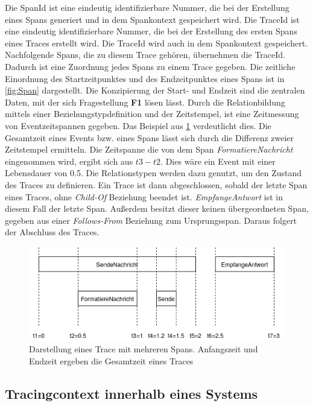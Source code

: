 Die SpanId ist eine eindeutig identifizierbare Nummer, die bei der Erstellung eines Spans generiert und in dem Spankontext gespeichert wird. Die TraceId ist eine eindeutig identifizierbare Nummer, die bei der Erstellung des ersten Spans eines Traces erstellt wird. Die TraceId wird auch in dem Spankontext gespeichert. Nachfolgende Spans, die zu diesem Trace gehören, übernehmen die TraceId. Dadurch ist eine Zuordnung jedes Spans zu einem Trace gegeben. Die zeitliche Einordnung des Startzeitpunktes und des Endzeitpunktes eines Spans ist in  \cref{fig:Span} dargestellt. Die Konzipierung der Start- und Endzeit sind die zentralen Daten, mit der sich Fragestellung \textbf{F1} lösen lässt. Durch die Relationbildung mittels einer Beziehungstypdefinition und der Zeitstempel, ist eine Zeitmessung von Eventzeitspannen gegeben. Das Beispiel aus \cref{fig:Eventzeitspannen} verdeutlicht dies. Die Gesamtzeit eines Events bzw. eines Spans lässt sich durch die Differenz zweier Zeitstempel ermitteln. Die Zeitspanne die von dem Span \emph{FormatiereNachricht} eingenommen wird, ergibt sich aus $t3 - t2$. Dies wäre ein Event mit einer Lebensdauer von 0.5. Die Relationstypen werden dazu genutzt, um den Zustand des Traces zu definieren. Ein Trace ist dann abgeschlossen, sobald der letzte Span eines Traces, ohne \emph{Child-Of} Beziehung beendet ist. \emph{EmpfangeAntwort} ist in diesem Fall der letzte Span. Außerdem besitzt dieser keinen übergeordneten Span, gegeben aus einer \emph{Follows-From} Beziehung zum Ursprungsspan. Daraus folgert der Abschluss des Traces.

\begin{figure}[!b]
	\centering
	\includegraphics[scale=0.7]{img/Design/Eventzeitspannen.png}
	\caption[Zeitmessung von Spans eines Traces]{Darstellung eines Trace mit mehreren Spans. Anfangszeit und Endzeit ergeben die Gesamtzeit eines Traces}
	\label{fig:Eventzeitspannen}
\end{figure}



\subsection{Tracingcontext innerhalb eines Systems}
\label{subsection:Tracingcontext innerhalb eines Systems}

